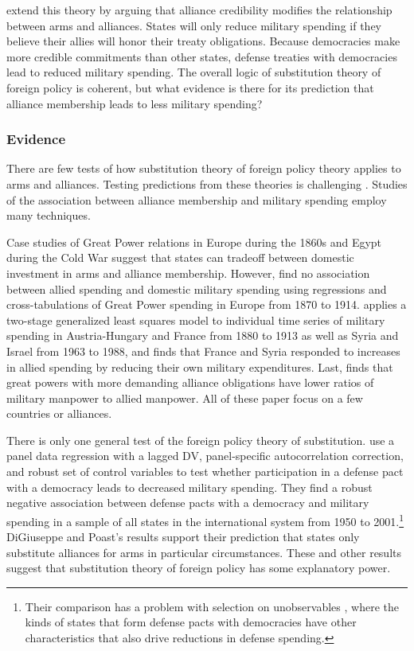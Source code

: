 \documentclass[12pt]{article}
\begin{document}
\citet{DigiuseppePoast2016} extend this theory by arguing that alliance credibility modifies the relationship between arms and alliances. 
States will only reduce military spending if they believe their allies will honor their treaty obligations.
Because democracies make more credible commitments than other states, defense treaties with democracies lead to reduced military spending. 
The overall logic of substitution theory of foreign policy is coherent, but what evidence is there for its prediction that alliance membership leads to less military spending? 



\subsubsection{Evidence}


There are few tests of how substitution theory of foreign policy theory applies to arms and alliances. 
Testing predictions from these theories is challenging \citep{Starr2000}. 
Studies of the association between alliance membership and military spending employ many techniques. 


Case studies of Great Power relations in Europe during the 1860s \citep{Morrow1993} and Egypt during the Cold War \citep{BarnettLevy1991} suggest that states can tradeoff between domestic investment in arms and alliance membership. However, \citet{MostSiverson1987} find no association between allied spending and domestic military spending using regressions and cross-tabulations of Great Power spending in Europe from 1870 to 1914. 
\citet{Sorokin1994} applies a two-stage generalized least squares model to individual time series of military spending in Austria-Hungary and France from 1880 to 1913 as well as Syria and Israel from 1963 to 1988, and finds that France and Syria responded to increases in allied spending by reducing their own military expenditures. 
Last, \citet{Conybeare1994} finds that great powers with more demanding alliance obligations have lower ratios of military manpower to allied manpower. 
All of these paper focus on a few countries or alliances. 


There is only one general test of the foreign policy theory of substitution. 
\citet{DigiuseppePoast2016} use a panel data regression with a lagged DV, panel-specific autocorrelation correction, and robust set of control variables to test whether participation in a defense pact with a democracy leads to decreased military spending. 
They find a robust negative association between defense pacts with a democracy and military spending in a sample of all states in the international system from 1950 to 2001.\footnote{Their comparison has a problem with selection on unobservables \citep{Chaudoinetal2016}, where the kinds of states that form defense pacts with democracies have other characteristics that also drive reductions in defense spending.} 
DiGiuseppe and Poast's results support their prediction that states only substitute alliances for arms in particular circumstances.
These and other results suggest that substitution theory of foreign policy has some explanatory power.
\end{document}
